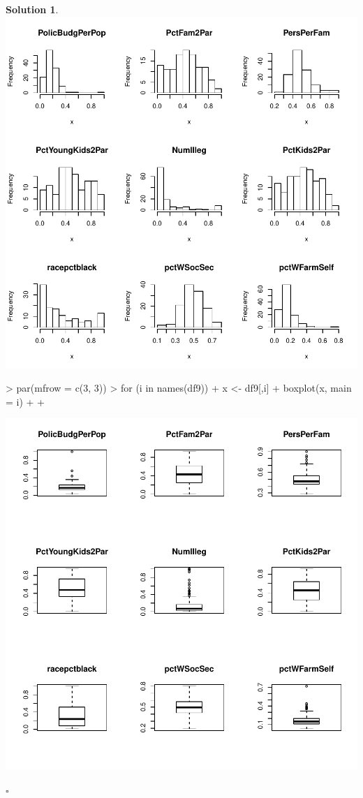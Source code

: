 \documentclass[twoside]{article}
\theoremstyle{definition}
\newtheorem*{solutionT}{Solution}
\newenvironment{solution}{\begin{cBox}\begin{solutionT}}{\hfill{\scriptsize\ensuremath{\square}}\end{solutionT}\end{cBox}}
\theoremstyle{definition}
\begin{document}
\begin{enumerate}
\begin{solution}
\includegraphics{week1-022}
\begin{Schunk}
\begin{Sinput}
> par(mfrow = c(3, 3))
> for (i in names(df9)) {
+   x <- df9[,i]
+   boxplot(x, main = i)
+   
+ }
\end{Sinput}
\end{Schunk}
\includegraphics{week1-023}

\end{solution}
\end{enumerate}
\end{document}
